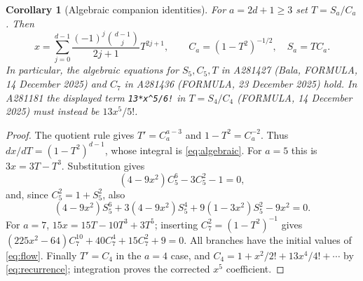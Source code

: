 \documentclass[11pt]{article}
\newtheorem{corollary}{Corollary}
\begin{document}
\begin{corollary}[Algebraic companion identities]\label{cor:algebraic}
For $a=2d+1\ge3$ set $T=S_a/C_a$. Then
\begin{equation}\label{eq:algebraic}
 x=\sum_{j=0}^{d-1}\frac{(-1)^j\binom{d-1}{j}}{2j+1}T^{2j+1},
 \qquad C_a=(1-T^2)^{-1/2},\quad S_a=TC_a.
\end{equation}
In particular, the algebraic equations for $S_5,C_5,T$ in A281427
(Bala, FORMULA, 14 December 2025) and $C_7$ in A281436
(FORMULA, 23 December 2025) hold. In A281181 the displayed term
\texttt{13*x\^{}5/6!} in $T=S_4/C_4$ (FORMULA, 14 December 2025)
must instead be $13x^5/5!$.
\end{corollary}
\begin{proof}
The quotient rule gives $T'=C_a^{a-3}$ and $1-T^2=C_a^{-2}$.
Thus $dx/dT=(1-T^2)^{d-1}$, whose integral is \eqref{eq:algebraic}.
For $a=5$ this is $3x=3T-T^3$. Substitution gives
\[
 (4-9x^2)C_5^6-3C_5^2-1=0,
\]
and, since $C_5^2=1+S_5^2$, also
\[
 (4-9x^2)S_5^6+3(4-9x^2)S_5^4+9(1-3x^2)S_5^2-9x^2=0.
\]
For $a=7$, $15x=15T-10T^3+3T^5$; inserting
$C_7^2=(1-T^2)^{-1}$ gives
$(225x^2-64)C_7^{10}+40C_7^4+15C_7^2+9=0$.
All branches have the initial values of \eqref{eq:flow}.
Finally $T'=C_4$ in the $a=4$ case, and
$C_4=1+x^2/2!+13x^4/4!+\cdots$ by \eqref{eq:recurrence};
integration proves the corrected $x^5$ coefficient.
\end{proof}
\end{document}
